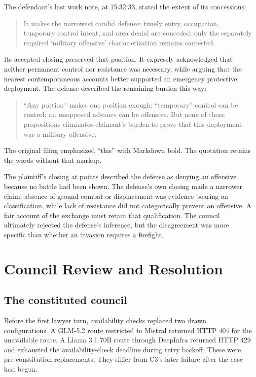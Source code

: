 \documentclass[11pt]{article}
\begin{document}
The defendant's last work note, at 15:32:33, stated the extent of its concessions:
\begin{quote}
It makes the narrowest candid defense: timely entry, occupation, temporary control intent, and area denial are conceded; only the separately required `military offensive' characterization remains contested.
\end{quote}
Its accepted closing preserved that position.  It expressly acknowledged that neither permanent control nor resistance was necessary, while arguing that the nearest contemporaneous accounts better supported an emergency protective deployment.  The defense described the remaining burden this way:
\begin{quote}
``Any portion'' makes one position enough; ``temporary'' control can be control; an unopposed advance can be offensive. But none of those propositions eliminates claimant's burden to prove that this deployment was a military offensive.
\end{quote}
The original filing emphasized ``this'' with Markdown bold.  The quotation retains the words without that markup.

The plaintiff's closing at points described the defense as denying an offensive because no battle had been shown.  The defense's own closing made a narrower claim: absence of ground combat or displacement was evidence bearing on classification, while lack of resistance did not categorically prevent an offensive.  A fair account of the exchange must retain that qualification.  The council ultimately rejected the defense's inference, but the disagreement was more specific than whether an invasion requires a firefight.

\section{Council Review and Resolution}

\subsection{The constituted council}

Before the first lawyer turn, availability checks replaced two drawn configurations.  A GLM-5.2 route restricted to Mistral returned HTTP 404 for the unavailable route.  A Llama 3.1 70B route through DeepInfra returned HTTP 429 and exhausted the availability-check deadline during retry backoff.  These were pre-constitution replacements.  They differ from C3's later failure after the case had begun.
\end{document}
